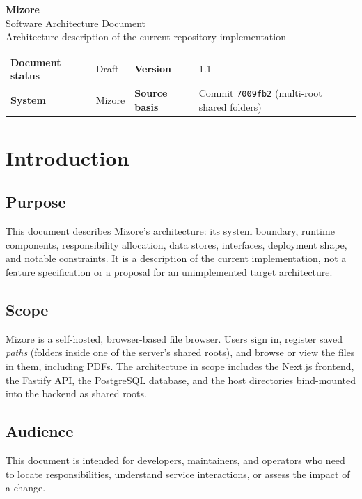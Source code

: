 \documentclass[10pt]{article}
\begin{document}
\begin{center}
  {\LARGE\bfseries Mizore}\\[2pt]
  {\Large Software Architecture Document}\\[4pt]
  {\small Architecture description of the current repository implementation}
\end{center}

\begin{center}
\begin{tabularx}{0.82\linewidth}{>{\bfseries}p{3.2cm}X
                                 >{\bfseries}p{2.6cm}X}
Document status & Draft & Version & 1.1 \\
System & Mizore & Source basis & Commit \texttt{7009fb2} (multi-root shared folders) \\
\end{tabularx}
\end{center}

\tableofcontents
\newpage

\section{Introduction}

\subsection{Purpose}
This document describes Mizore's architecture: its system boundary, runtime components,
responsibility allocation, data stores, interfaces, deployment shape, and notable constraints.
It is a description of the current implementation, not a feature specification or a proposal
for an unimplemented target architecture.

\subsection{Scope}
Mizore is a self-hosted, browser-based file browser. Users sign in, register saved
\emph{paths} (folders inside one of the server's shared roots), and browse or view the files
in them, including PDFs. The architecture in scope includes the Next.js frontend, the Fastify
API, the PostgreSQL database, and the host directories bind-mounted into the backend as
shared roots.

\subsection{Audience}
This document is intended for developers, maintainers, and operators who need to locate
responsibilities, understand service interactions, or assess the impact of a change.
\end{document}
